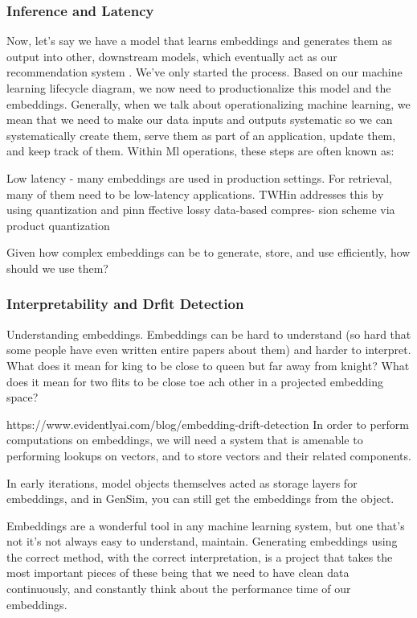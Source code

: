 \documentclass[11pt, table]{diazessay} %
\begin{document}
\begin{sloppypar}
\subsubsection*{Inference and Latency }
Now, let's say we have a model that learns embeddings and generates them as output into other, downstream models, which eventually act as our recommendation system . We've only started the process. Based on our machine learning lifecycle diagram, we now need to productionalize this model and the embeddings. Generally, when we talk about operationalizing machine learning, we mean that we need to make our data inputs and outputs systematic so we can systematically create them, serve them as part of an application, update them, and keep track of them. Within Ml operations, these steps are often known as: 

Low latency - many embeddings are used in production settings. For retrieval, many of them need to be low-latency applications. TWHin addresses this by using quantization and pinn ffective lossy data-based compres-
sion scheme via product quantization

Given how complex embeddings can be to generate, store, and use efficiently, how should we use them? 


\subsubsection*{Interpretability and Drfit Detection}
Understanding embeddings. Embeddings can be hard to understand (so hard that some people have even written entire papers about them) and harder to interpret. What does it mean for king to be close to queen but far away from knight? What does it mean for two flits to be close toe ach other in a projected embedding space? 

https://www.evidentlyai.com/blog/embedding-drift-detection
In order to perform computations on embeddings, we will need a system that is amenable to performing lookups on vectors, and to store vectors and their related components. 

In early iterations, model objects themselves acted as storage layers for embeddings, and in GenSim, you can still get the embeddings from the object. 

Embeddings are a wonderful tool in any machine learning system, but one that's not it's not always easy to understand, maintain. Generating embeddings using the correct method, with the correct interpretation, is a project that takes  the most important pieces of these being that we need to have clean data continuously, and constantly think about the performance time of our embeddings. 


\end{sloppypar}
\end{document}
